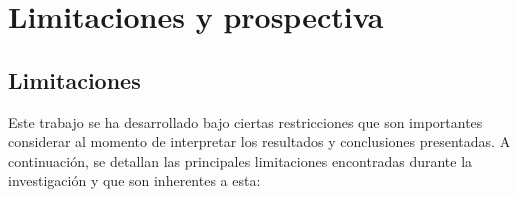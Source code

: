 \chapter{Limitaciones y prospectiva}




\section{Limitaciones}

Este trabajo se ha desarrollado bajo ciertas restricciones que son importantes considerar al momento de interpretar los resultados y conclusiones presentadas. A continuación, se detallan las principales limitaciones encontradas durante la investigación y que son inherentes a esta:

